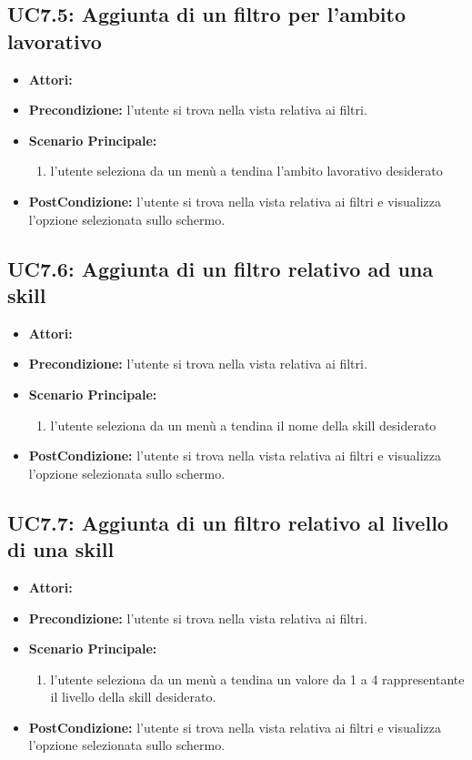 \subsection{UC7.5: Aggiunta di un filtro per l'ambito lavorativo}
\begin{itemize}
	\item \textbf{Attori:}\loggedusr
	\item \textbf{Precondizione:} l'utente si trova nella vista relativa ai filtri.
	\item \textbf{Scenario Principale:}
	\begin{enumerate}
		\item l'utente seleziona da un menù a tendina l'ambito lavorativo desiderato
	\end{enumerate}
	\item \textbf{PostCondizione:}  l'utente si trova nella vista relativa ai filtri e visualizza l'opzione selezionata sullo schermo.
\end{itemize}

\subsection{UC7.6: Aggiunta di un filtro relativo ad una skill }
\begin{itemize}
	\item \textbf{Attori:}\loggedusr
	\item \textbf{Precondizione:} l'utente si trova nella vista relativa ai filtri.
	\item \textbf{Scenario Principale:}
	\begin{enumerate}
		\item l'utente seleziona da un menù a tendina il nome della skill desiderato
	\end{enumerate}
	\item \textbf{PostCondizione:}  l'utente si trova nella vista relativa ai filtri e visualizza l'opzione selezionata sullo schermo.
\end{itemize}

\subsection{UC7.7: Aggiunta di un filtro relativo al livello di una skill}
\begin{itemize}
	\item \textbf{Attori:}\loggedusr
	\item \textbf{Precondizione:} l'utente si trova nella vista relativa ai filtri.
	\item \textbf{Scenario Principale:}
	\begin{enumerate}
		\item l'utente seleziona da un menù a tendina un valore da 1 a 4 rappresentante il livello della skill desiderato.
	\end{enumerate}
	\item \textbf{PostCondizione:}  l'utente si trova nella vista relativa ai filtri e visualizza l'opzione selezionata sullo schermo.
\end{itemize}


